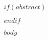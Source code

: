\documentclass[10pt,b5paper,twocolumn]{extbook}
\begin{document}
$if(abstract)$
\begin{abstract}
$abstract$
\end{abstract}
$endif$



\pagestyle{fancy}

$body$


\end{document}
